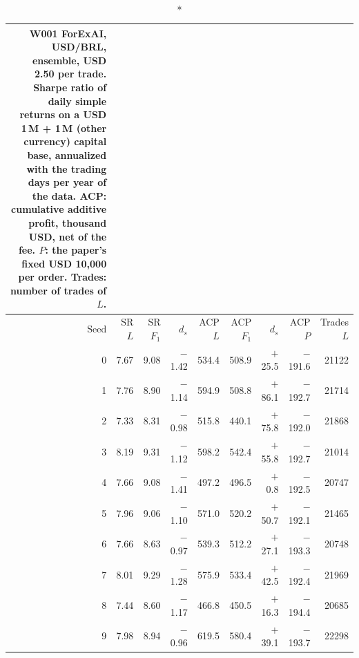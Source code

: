 \begin{longtable}{@{}rrrrrrrrr@{}}
\caption*{\small W001 ForExAI, USD/BRL, ensemble, USD 2.50 per trade. Sharpe ratio of daily simple returns on a USD 1\,M + 1\,M (other currency) capital base, annualized with the trading days per year of the data. ACP: cumulative additive profit, thousand USD, net of the fee. $P$: the paper's fixed USD 10,000 per order. Trades: number of trades of $L$.}\\
\toprule
Seed & SR $L$ & SR $F_1$ & $d_s$ & ACP $L$ & ACP $F_1$ & $d_s$ & ACP $P$ & Trades $L$\\ \midrule\endhead
0 & 7.67 & 9.08 & $-$1.42 & 534.4 & 508.9 & $+$25.5 & $-$191.6 & 21122\\
1 & 7.76 & 8.90 & $-$1.14 & 594.9 & 508.8 & $+$86.1 & $-$192.7 & 21714\\
2 & 7.33 & 8.31 & $-$0.98 & 515.8 & 440.1 & $+$75.8 & $-$192.0 & 21868\\
3 & 8.19 & 9.31 & $-$1.12 & 598.2 & 542.4 & $+$55.8 & $-$192.7 & 21014\\
4 & 7.66 & 9.08 & $-$1.41 & 497.2 & 496.5 & $+$0.8 & $-$192.5 & 20747\\
5 & 7.96 & 9.06 & $-$1.10 & 571.0 & 520.2 & $+$50.7 & $-$192.1 & 21465\\
6 & 7.66 & 8.63 & $-$0.97 & 539.3 & 512.2 & $+$27.1 & $-$193.3 & 20748\\
7 & 8.01 & 9.29 & $-$1.28 & 575.9 & 533.4 & $+$42.5 & $-$192.4 & 21969\\
8 & 7.44 & 8.60 & $-$1.17 & 466.8 & 450.5 & $+$16.3 & $-$194.4 & 20685\\
9 & 7.98 & 8.94 & $-$0.96 & 619.5 & 580.4 & $+$39.1 & $-$193.7 & 22298\\
\bottomrule\end{longtable}
